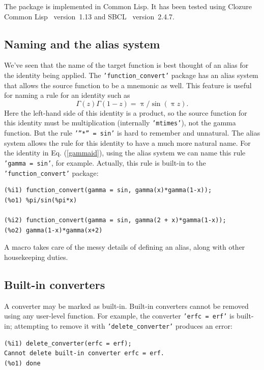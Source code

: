 \documentclass[12pt,fleqn]{extarticle}
\newcommand{\ttq}[1]{\texttt{'#1'}}
\newcommand{\funconvert}{\ttq{function\_convert}{ }}
\newenvironment{maximabox}
  {\begin{tcolorbox}[
      breakable,
      enhanced,
      colback=white,
      colframe=black!8,
      boxrule=0pt,
      borderline west={2.2pt}{0pt}{black!25},
      arc=1pt,
      left=11pt,
      right=7pt,
      top=9pt,
      bottom=9pt,
      before skip=14pt,
      after skip=14pt
    ]}
  {\end{tcolorbox}}
\begin{document}
The package is implemented in Common Lisp.  It has been tested using
Clozure Common Lisp~\cite{ccl} version~1.13 and
SBCL~\cite{sbcl} version~2.4.7.


\subsection{Naming and the alias system}
\label{sec:alias_system}
We've seen that the name of the target function is best thought of an alias for the identity being 
applied.  The \funconvert package has an alias system that allows the source function to be a
mnemonic as well.  This feature is useful for naming a rule for an identity 
such as 
\begin{equation}
\Gamma(z)\Gamma(1-z)=\uppi/\sin(\uppi z).
\label{gammaid}
\end{equation}
Here the left-hand side of this identity is a product, so the source function for this identity must be multiplication (internally \ttq{mtimes}), not the gamma function. But the rule \ttq{”*” = sin} is
hard to remember and unnatural.  The alias system allows the rule for this identity to have a much more natural name. For the identity in Eq. (\ref{gammaid}), using the alias system we can 
name this rule \ttq{gamma = sin}, for example. Actually, this rule is built-in to the \funconvert package:

\begin{maximabox}
\begin{verbatim}
(%i1) function_convert(gamma = sin, gamma(x)*gamma(1-x));
(%o1) %pi/sin(%pi*x)

(%i2) function_convert(gamma = sin, gamma(2 + x)*gamma(1-x));
(%o2) gamma(1-x)*gamma(x+2)
\end{verbatim}
\end{maximabox}

A macro takes care of the messy details of defining an alias, along with other housekeeping duties. 
 
 
 \subsection{Built-in converters}

A converter may be marked as built-in. Built-in converters cannot be removed using any user-level function. For example, the converter \ttq{erfc = erf} is built-in; attempting to remove it with \ttq{delete\_converter} produces an error:
\begin{maximabox}
\begin{verbatim}
(%i1) delete_converter(erfc = erf);
Cannot delete built-in converter erfc = erf.
(%o1) done
\end{verbatim}
\end{maximabox}
 
\end{document}
